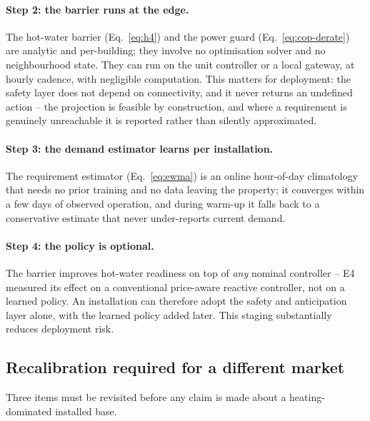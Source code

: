 \documentclass[11pt]{article}
\begin{document}
\paragraph{Step 2: the barrier runs at the edge.} The hot-water barrier
(Eq.~\ref{eq:h4}) and the power guard (Eq.~\ref{eq:cop-derate}) are analytic and
per-building; they involve no optimisation solver and no neighbourhood state.
They can run on the unit controller or a local gateway, at hourly cadence, with
negligible computation. This matters for deployment: the safety layer does not
depend on connectivity, and it never returns an undefined action -- the projection
is feasible by construction, and where a requirement is genuinely unreachable it
is reported rather than silently approximated.

\paragraph{Step 3: the demand estimator learns per installation.} The requirement
estimator (Eq.~\ref{eq:ewma}) is an online hour-of-day climatology that needs no
prior training and no data leaving the property; it converges within a few days
of observed operation, and during warm-up it falls back to a conservative
estimate that never under-reports current demand.

\paragraph{Step 4: the policy is optional.} The barrier improves hot-water
readiness on top of \emph{any} nominal controller -- E4 measured its effect on a
conventional price-aware reactive controller, not on a learned policy. An
installation can therefore adopt the safety and anticipation layer alone, with the
learned policy added later. This staging substantially reduces deployment risk.

\subsection{Recalibration required for a different market}

Three items must be revisited before any claim is made about a heating-dominated
installed base.
\end{document}
